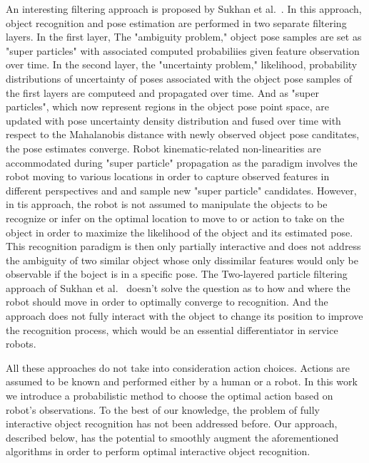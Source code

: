 \documentclass[conference]{IEEEtran}
\begin{document}
    An interesting filtering approach is proposed by Sukhan et al.~\cite{sukhan2011Dependable3DobjectRecognitionWithTwoLayeredParticleFilter}. In this approach, object recognition and pose estimation are performed in two separate filtering layers. In the first layer, The "ambiguity problem," object pose samples are set as "super particles" with associated computed probabiliies given feature observation over time. In the second layer, the "uncertainty problem," likelihood, probability distributions of uncertainty of poses associated with the object pose samples of the first layers are computeed and propagated over time. 
    And as "super particles", which now represent regions in the object pose point space, are updated with pose uncertainty density distribution and fused over time  with respect to the Mahalanobis distance with newly observed object pose canditates,  the pose estimates converge.  Robot kinematic-related non-linearities are accommodated during "super particle" propagation as the paradigm involves the robot moving to various locations in order to capture observed features in different perspectives and and sample new "super particle" candidates. However, in tis approach, the robot is not assumed to manipulate the objects 
    to be recognize or infer on the optimal location to move to or action to take on the object in order to maximize the likelihood of the object and its estimated pose. This recognition paradigm is then only partially interactive and does not address the ambiguity of two similar object whose only dissimilar features would only be observable if the boject is in a specific pose.
    The Two-layered particle filtering approach of Sukhan et al.~\cite{sukhan2011Dependable3DobjectRecognitionWithTwoLayeredParticleFilter} doesn't solve the question as to how and where the robot should move in order to optimally converge to recognition. And the approach does not fully interact with the object to change its position to improve the recognition process, which would be an essential differentiator in service robots. 
    
    All these approaches do not take into consideration action choices. Actions are assumed to be known and performed either by a human or a robot. In this work we introduce a probabilistic method to choose the optimal action based on robot's observations. To the best of our knowledge, the problem of fully interactive object recognition has not been addressed before. 
    Our approach, described below, has the potential to smoothly augment the aforementioned algorithms in order to perform optimal interactive object recognition.
    
\end{document}
